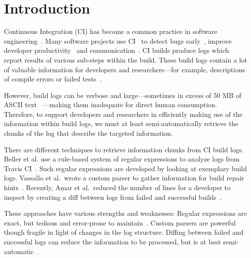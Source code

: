 \documentclass[sigconf]{acmart}
\begin{document}

\maketitle

\section{Introduction}
Continuous Integration (CI) has become a common practice in software
engineering~\cite{hilton2016usage}.  Many software projects use
CI~\cite{hilton2016usage,staahl2014modeling,beller2017oops} to detect
bugs early~\cite{vasilescu2015quality,duvall2007continuous}, improve
developer productivity~\cite{miller2008hundred,hilton2016usage} and
communication~\cite{downs2012ambient}.  CI builds produce logs which
report results of various sub-steps within the build.  These build logs
contain a lot of valuable information for developers and researchers---for example, descriptions of compile errors or failed
tests~\cite{beller2017oops,seo2014programmers,vassallo2017a-tale}.

However, build logs can be verbose and large---sometimes in excess of
50 MB of ASCII text ~\cite{beller2017oops}---making them inadequate
for direct human consumption. Therefore, to support developers and
researchers in efficiently making use of the information within build
logs, we must at least semi-automatically retrieve the chunks of the
log that describe the targeted information.

There are different techniques to retrieve information chunks from CI
build logs. Beller et al. use a rule-based system of regular
expressions to analyze logs from Travis CI~\cite{beller2017oops}.
Such regular expressions are developed by looking at exemplary build
logs.  Vassallo et al.\ wrote a custom parser to gather information
for build repair hints~\cite{vassallo2018un-break}.  Recently, Amar et
al.\ reduced the number of lines for a developer to inspect by
creating a diff between logs from failed and successful
builds~\cite{amar2019mining}.

These approaches have various strengths and weaknesses: Regular
expressions are exact, but tedious and error-prone to
maintain~\cite{michael2019regexes}.  Custom parsers are powerful
though fragile in light of changes in the log structure. Diffing
between failed and successful logs can reduce the information to be
processed, but is at best semi-automatic~\cite{amar2019mining}.
\end{document}
